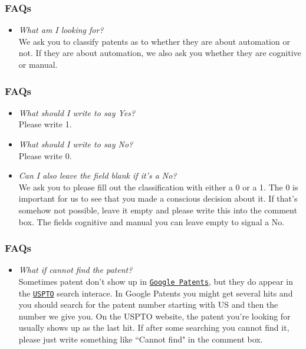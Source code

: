\documentclass[10pt]{beamer}
\begin{document}
\begin{frame}\frametitle{FAQs}
	\begin{itemize}	
	\item \textit{What am I looking for?}\\[0.1cm]
	We ask you to classify patents as to whether they are about automation or not. If they are about automation, we also ask you whether they are cognitive or manual.
	\end{itemize}
\end{frame}


\begin{frame}\frametitle{FAQs}
	\begin{itemize}	
	\item \textit{What should I write to say Yes?}\\[0.1cm]
	Please write 1.
	\item \textit{What should I write to say No?}\\[0.1cm]
	Please write 0.
	\item \textit{Can I also leave the field blank if it's a No?}\\[0.1cm]
	We ask you to please fill out the classification with either a 0 or a 1. The 0 is important for us to see that you made a conscious decision about it. If that's somehow not possible, leave it empty and please write this into the comment box. The fields cognitive and manual you can leave empty to signal a No.
		\end{itemize}
\end{frame}


\begin{frame}\frametitle{FAQs}
	\begin{itemize}	
	\item \textit{What if cannot find the patent?}\\[0.1cm]
Sometimes patent don't show up in \href{https://www.google.com/patents}{\texttt{Google Patents}}, but they do appear in the \href{http://patft.uspto.gov/netahtml/PTO/search-bool.html}{\texttt{USPTO}} search interace. In Google Patents you might get several hits and you should search for the patent number starting with US and then the number we give you. On the USPTO website, the patent you're looking for usually shows up as the last hit. If after some searching you cannot find it, please just write something like ``Cannot find" in the comment box.
	\end{itemize}
\end{frame}
\end{document}
